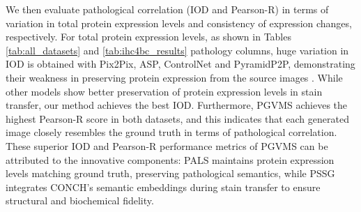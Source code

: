 \documentclass[journal,twoside,web]{ieeecolor}
\begin{document}
 We then evaluate pathological correlation (IOD and Pearson-R) in terms of variation in total protein expression levels and consistency of expression changes, respectively. For total protein expression levels, as shown in Tables \ref{tab:all_datasets} and \ref{tab:ihc4bc_results} pathology columns, huge variation in IOD is obtained with Pix2Pix, ASP, ControlNet and PyramidP2P, demonstrating their weakness in preserving protein expression from the source images \cite{zhang2022mvfstain}. While other models show better preservation of protein expression levels in stain transfer, our method achieves the best IOD. Furthermore, PGVMS achieves the highest Pearson-R score in both datasets, and this indicates that each generated image closely resembles the ground truth in terms of pathological correlation. These superior IOD and Pearson-R performance metrics of PGVMS can be attributed to the innovative components: PALS maintains protein expression levels matching ground truth, preserving pathological semantics, while PSSG integrates CONCH's semantic embeddings during stain transfer to ensure structural and biochemical fidelity.
 
\end{document}

